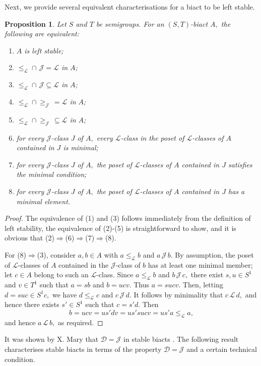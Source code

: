 \documentclass[twoside,a4paper,12pt,reqno]{amsart}
\theoremstyle{plain}
\newtheorem{prop}[thm]{Proposition}
\theoremstyle{definition}
\renewcommand{\l}{\mbox{${\mathcal{L}}$}}
\renewcommand{\d}{\mbox{${\mathcal{D}}$}}
\renewcommand{\j}{\mbox{${\mathcal{J}}$}}
\newcommand{\leql}{\leq_{\mathcal{L}}}
\newcommand{\geqj}{\geq_{\mathcal{J}}}
\begin{document}
Next, we provide several equivalent characterisations for a biact to be left stable. 

\begin{prop}\label{prop:lstable}
Let $S$ and $T$ be semigroups.  For an $(S,T)$-biact $A,$ the following are equivalent:
\begin{enumerate}[leftmargin=*]
\item[\emph{(1)}] $A$ is left stable;
\item[\emph{(2)}] $\leql\cap\,\j=\l$ in $A$;
\item[\emph{(3)}] $\leql\cap\,\j\subseteq\l$ in $A$;
\item[\emph{(4)}] $\leql\cap\geqj\,=\l$ in $A$;
\item[\emph{(5)}] $\leql\cap\geqj\,\subseteq\l$ in $A$;
\item[\emph{(6)}] for every $\j$-class $J$ of $A,$ every $\l$-class in the poset of $\l$-classes of $A$ contained in $J$ is minimal;
\item[\emph{(7)}] for every $\j$-class $J$ of $A,$ the poset of $\l$-classes of $A$ contained in $J$ satisfies the minimal condition;
\item[\emph{(8)}] for every $\j$-class $J$ of $A,$ the poset of $\l$-classes of $A$ contained in $J$ has a minimal element.
\end{enumerate}
\end{prop}

\begin{proof}
The equivalence of (1) and (3) follows immediately from the definition of left stability, the equivalence of (2)-(5) is straightforward to show, and it is obvious that (2)$\Rightarrow$(6)$\Rightarrow$(7)$\Rightarrow$(8). 

For (8)$\Rightarrow$(3), consider $a,b\in A$ with $a\leql b$ and $a\,\j\,b.$  By assumption, the poset of $\l$-classes of $A$ contained in the $\j$-class of $b$ has at least one minimal member; let $c\in A$ belong to such an $\l$-class.  Since $a\leql b$ and $b\,\j\,c,$ there exist $s,u\in S^1$ and $v\in T^1$ such that $a=sb$ and $b=ucv.$  Thus $a=sucv.$  Then, letting $d=suc\in S^1c,$ we have $d\leql c$ and $c\,\j\,d.$  It follows by minimality that $c\,\l\,d,$ and hence there exists $s'\in S^1$ such that $c=s'd.$  Then
$$b=ucv=us'dv=us'sucv=us'a\leql a,$$
and hence $a\,\l\,b,$ as required.
\end{proof}

It was shown by X.\! Mary that $\d=\j$ in stable biacts \cite[Lemma 3.15]{Mary}.  The following result characterises stable biacts in terms of the property $\d=\j$ and a certain technical condition.
\end{document}
